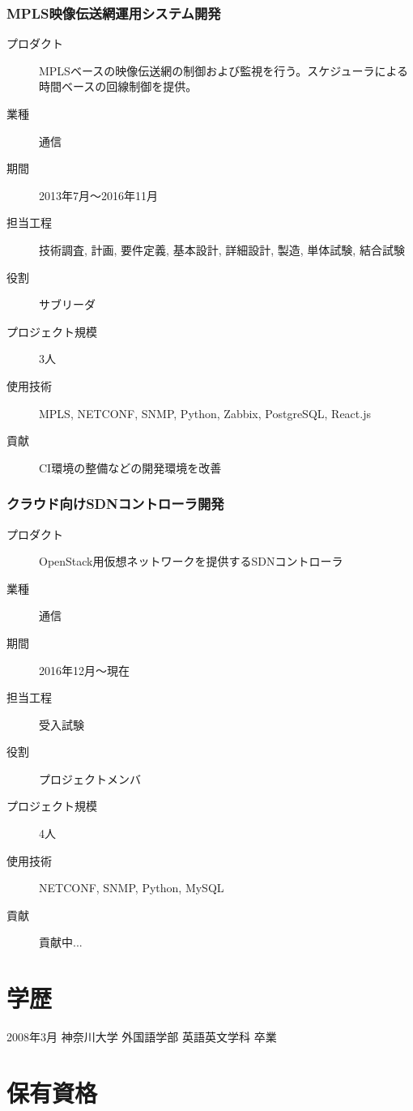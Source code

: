 \documentclass[9pt]{jsarticle}
\begin{document}
\subsubsection{MPLS映像伝送網運用システム開発}

\begin{description}
    \item[プロダクト] MPLSベースの映像伝送網の制御および監視を行う。スケジューラによる時間ベースの回線制御を提供。
    \item[業種] 通信
    \item[期間] 2013年7月〜2016年11月
    \item[担当工程] 技術調査, 計画, 要件定義, 基本設計, 詳細設計, 製造, 単体試験, 結合試験
    \item[役割] サブリーダ
    \item[プロジェクト規模] 3人
    \item[使用技術] MPLS, NETCONF, SNMP, Python, Zabbix, PostgreSQL, React.js
    \item[貢献] CI環境の整備などの開発環境を改善
\end{description}

\subsubsection{クラウド向けSDNコントローラ開発}

\begin{description}
    \item[プロダクト] OpenStack用仮想ネットワークを提供するSDNコントローラ
    \item[業種] 通信
    \item[期間] 2016年12月〜現在
    \item[担当工程] 受入試験
    \item[役割] プロジェクトメンバ
    \item[プロジェクト規模] 4人
    \item[使用技術] NETCONF, SNMP, Python, MySQL
    \item[貢献] 貢献中...
\end{description}


\section{学歴}

2008年3月 神奈川大学 外国語学部 英語英文学科 卒業

\section{保有資格}
\end{document}
